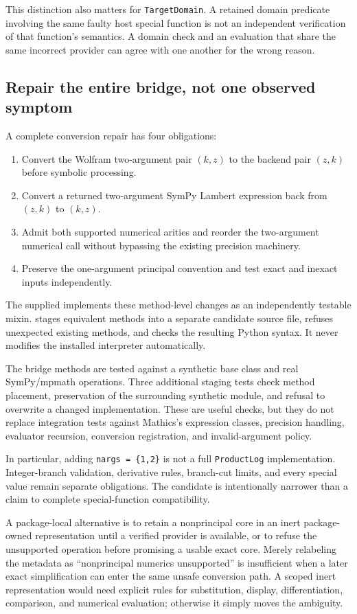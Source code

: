\documentclass[11pt,a4paper]{article}
\newcommand{\code}[1]{\texttt{#1}}
\begin{document}
This distinction also matters for \code{TargetDomain}. A retained domain predicate involving the same faulty host special function is not an independent verification of that function's semantics. A domain check and an evaluation that share the same incorrect provider can agree with one another for the wrong reason.

\subsection{Repair the entire bridge, not one observed symptom}
A complete conversion repair has four obligations:
\begin{enumerate}
\item Convert the Wolfram two-argument pair $(k,z)$ to the backend pair $(z,k)$ before symbolic processing.
\item Convert a returned two-argument SymPy Lambert expression back from $(z,k)$ to $(k,z)$.
\item Admit both supported numerical arities and reorder the two-argument numerical call without bypassing the existing precision machinery.
\item Preserve the one-argument principal convention and test exact and inexact inputs independently.
\end{enumerate}
The supplied  implements these method-level changes as an independently testable mixin.  stages equivalent methods into a separate candidate source file, refuses unexpected existing methods, and checks the resulting Python syntax. It never modifies the installed interpreter automatically.

The bridge methods are tested against a synthetic base class and real SymPy/mpmath operations. Three additional staging tests check method placement, preservation of the surrounding synthetic module, and refusal to overwrite a changed implementation. These are useful checks, but they do not replace integration tests against Mathics's expression classes, precision handling, evaluator recursion, conversion registration, and invalid-argument policy.

In particular, adding \code{nargs = \{1,2\}} is not a full \code{ProductLog} implementation. Integer-branch validation, derivative rules, branch-cut limits, and every special value remain separate obligations. The candidate is intentionally narrower than a claim to complete special-function compatibility.

A package-local alternative is to retain a nonprincipal core in an inert package-owned representation until a verified provider is available, or to refuse the unsupported operation before promising a usable exact core. Merely relabeling the metadata as ``nonprincipal numerics unsupported'' is insufficient when a later exact simplification can enter the same unsafe conversion path. A scoped inert representation would need explicit rules for substitution, display, differentiation, comparison, and numerical evaluation; otherwise it simply moves the ambiguity.
\end{document}
